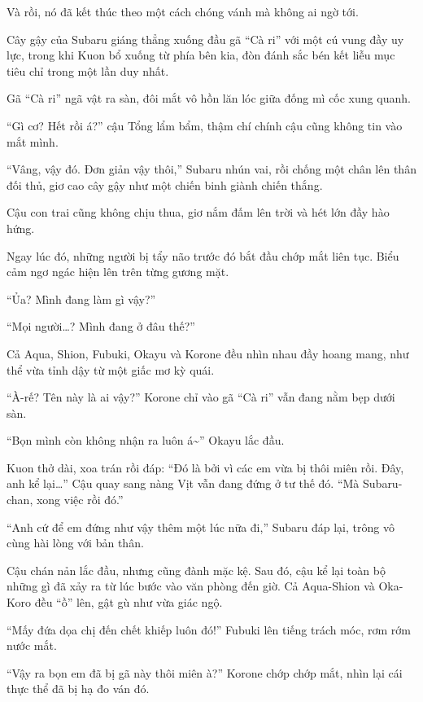 \documentclass[../main.tex]{subfiles}
\begin{document}
\omk

Và rồi, nó đã kết thúc theo một cách chóng vánh mà không ai ngờ tới.

Cây gậy của Subaru giáng thẳng xuống đầu gã ``Cà ri'' với một cú vung đầy uy lực, trong khi Kuon bổ xuống từ phía bên kia, đòn đánh sắc bén kết liễu mục tiêu chỉ trong một lần duy nhất.

Gã ``Cà ri'' ngã vật ra sàn, đôi mắt vô hồn lăn lóc giữa đống mì cốc xung quanh.


``Gì cơ? Hết rồi á?'' cậu Tổng lẩm bẩm, thậm chí chính cậu cũng không tin vào mắt mình.

``Vâng, vậy đó. Đơn giản vậy thôi,'' Subaru nhún vai, rồi chống một chân lên thân đối thủ, giơ cao cây gậy như một chiến binh giành chiến thắng.

Cậu con trai cũng không chịu thua, giơ nắm đấm lên trời và hét lớn đầy hào hứng.

Ngay lúc đó, những người bị tẩy não trước đó bắt đầu chớp mắt liên tục. Biểu cảm ngơ ngác hiện lên trên từng gương mặt.

``Ủa? Mình đang làm gì vậy?''

``Mọi người\dots? Mình đang ở đâu thế?''

Cả Aqua, Shion, Fubuki, Okayu và Korone đều nhìn nhau đầy hoang mang, như thể vừa tỉnh dậy từ một giấc mơ kỳ quái.

``À-rế? Tên này là ai vậy?'' Korone chỉ vào gã ``Cà ri'' vẫn đang nằm bẹp dưới sàn.

``Bọn mình còn không nhận ra luôn á\~{}'' Okayu lắc đầu.

Kuon thở dài, xoa trán rồi đáp: ``Đó là bởi vì các em vừa bị thôi miên rồi. Đây, anh kể lại\dots'' Cậu quay sang nàng Vịt vẫn đang đứng ở tư thế đó. ``Mà Subaru-chan, xong việc rồi đó.''

``Anh cứ để em đứng như vậy thêm một lúc nữa đi,'' Subaru đáp lại, trông vô cùng hài lòng với bản thân.

Cậu chán nản lắc đầu, nhưng cũng đành mặc kệ. Sau đó, cậu kể lại toàn bộ những gì đã xảy ra từ lúc bước vào văn phòng đến giờ. Cả Aqua-Shion và Oka-Koro đều ``ồ'' lên, gật gù như vừa giác ngộ.

``Mấy đứa dọa chị đến chết khiếp luôn đó!'' Fubuki lên tiếng trách móc, rơm rớm nước mắt.

``Vậy ra bọn em đã bị gã này thôi miên à?'' Korone chớp chớp mắt, nhìn lại cái thực thể đã bị hạ đo ván đó.
\end{document}
